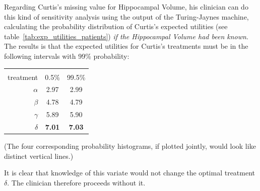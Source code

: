 \documentclass[utf8]{FrontiersinHarvard} %
\renewcommand*{\|}[1][]{\nonscript\:#1\vert\nonscript\:\mathopen{}}
\newcommand*{\tjm}{Turing-Jaynes machine}
\begin{document}
\medskip

Regarding Curtis's missing value for Hippocampal Volume, his clinician can do this kind of sensitivity analysis using the output of the \tjm, calculating the probability distribution of Curtis's expected utilities (see table~\ref{tab:exp_utilities_patients}) \emph{if the Hippocampal Volume had been known}. The results is that the expected utilities for Curtis's treatments must be in the following  intervals with 99\% probability:

\medskip

\begin{table}[!h]
  \centering
  \begin{tabular}{rcc}
    \hline\\[-\jot]
    treatment&0.5\%&99.5\% \\[\jot]
    $\alpha$ & 2.97 & 2.99 \\
    $\beta$ & 4.78 & 4.79 \\
    $\gamma$ & 5.89 & 5.90 \\
    $\delta$ & \textbf{7.01} & \textbf{7.03}\\
    \hline
  \end{tabular}
\end{table}

(The four corresponding probability histograms, if plotted jointly, would look like distinct vertical lines.)

It is clear that knowledge of this variate would not change the optimal treatment $\delta$. The clinician therefore proceeds without it.
\end{document}
